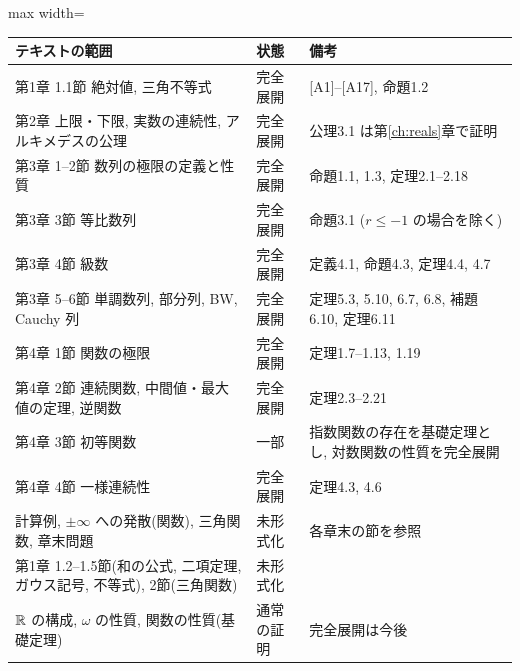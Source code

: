 \begin{center}\small
\begin{adjustbox}{max width=\linewidth}
\begin{tabular}{lll}
  \toprule
  テキストの範囲 & 状態 & 備考 \\
  \midrule
  第1章 1.1節 絶対値, 三角不等式 & 完全展開 & [A1]--[A17], 命題1.2 \\
  第2章 上限・下限, 実数の連続性, アルキメデスの公理 & 完全展開 & 公理3.1 は第\ref{ch:reals}章で証明 \\
  第3章 1--2節 数列の極限の定義と性質 & 完全展開 & 命題1.1, 1.3, 定理2.1--2.18 \\
  第3章 3節 等比数列 & 完全展開 & 命題3.1 ($r \leq -1$ の場合を除く) \\
  第3章 4節 級数 & 完全展開 & 定義4.1, 命題4.3, 定理4.4, 4.7 \\
  第3章 5--6節 単調数列, 部分列, BW, Cauchy 列 & 完全展開 & 定理5.3, 5.10, 6.7, 6.8, 補題6.10, 定理6.11 \\
  第4章 1節 関数の極限 & 完全展開 & 定理1.7--1.13, 1.19 \\
  第4章 2節 連続関数, 中間値・最大値の定理, 逆関数 & 完全展開 & 定理2.3--2.21 \\
  第4章 3節 初等関数 & 一部 & 指数関数の存在を基礎定理とし, 対数関数の性質を完全展開 \\
  第4章 4節 一様連続性 & 完全展開 & 定理4.3, 4.6 \\
  計算例, $\pm\infty$ への発散(関数), 三角関数, 章末問題 & 未形式化 & 各章末の節を参照 \\
  第1章 1.2--1.5節(和の公式, 二項定理, ガウス記号, 不等式), 2節(三角関数) & 未形式化 & \\
  $\mathbb{R}$ の構成, $\omega$ の性質, 関数の性質(基礎定理) & 通常の証明 & 完全展開は今後 \\
  \bottomrule
\end{tabular}
\end{adjustbox}
\end{center}
